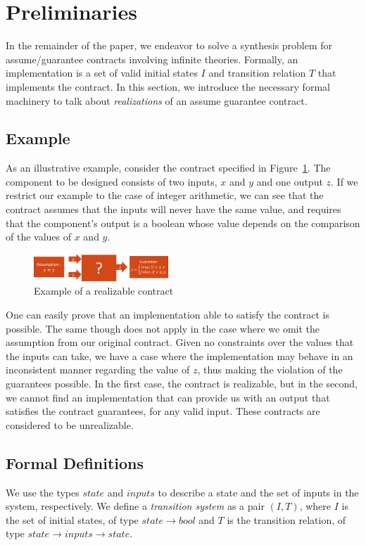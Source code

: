 \section{Preliminaries}
\label{sec:preliminaries}

In the remainder of the paper, we endeavor to solve a synthesis problem for assume/guarantee contracts involving infinite theories.  Formally, an implementation is a set of valid initial states $I$ and transition relation $T$ that implements the contract.  In this section, we introduce the necessary formal machinery to talk about {\em realizations} of an assume guarantee contract.

\subsection{Example}
As an illustrative example, consider the contract specified in
Figure~\ref{fg:example}. The component to be designed consists of two
inputs, $x$ and $y$ and one output $z$. If we restrict our example to the case
of integer arithmetic, we can see that the contract assumes that the inputs will
never have the same value, and requires that the component's output is a boolean
whose value depends on the comparison of the values of $x$ and $y$.

\begin{figure}[H]
	\centering
	\includegraphics[width=0.45\textwidth,height=\textheight,keepaspectratio]{real1-crop}    	
	\caption{Example of a realizable contract}
	\label{fg:example}
\end{figure}


One can easily prove that an implementation able to satisfy the contract is
possible. The same though does not apply in the case where we omit the
assumption from our original contract. Given no constraints over the values that the inputs can take, we have a case where the implementation may
behave in an inconsistent manner regarding the value of $z$, thus making the
violation of the guarantees possible. In the first case, the contract is realizable, but in the second, we
cannot find an implementation that can provide us with an output that satisfies
the contract guarantees, for any valid input. These contracts are considered to
be unrealizable.

\subsection{Formal Definitions}
We use the types $state$ and $inputs$ to describe a state
and the set of inputs in the system, respectively. We define a
\textit{transition system} as a pair $(I,T)$, where $I$ is the set of initial states, of type $state \rightarrow
bool$ and $T$ is the transition relation, of type $state \rightarrow inputs
\rightarrow state$. 

